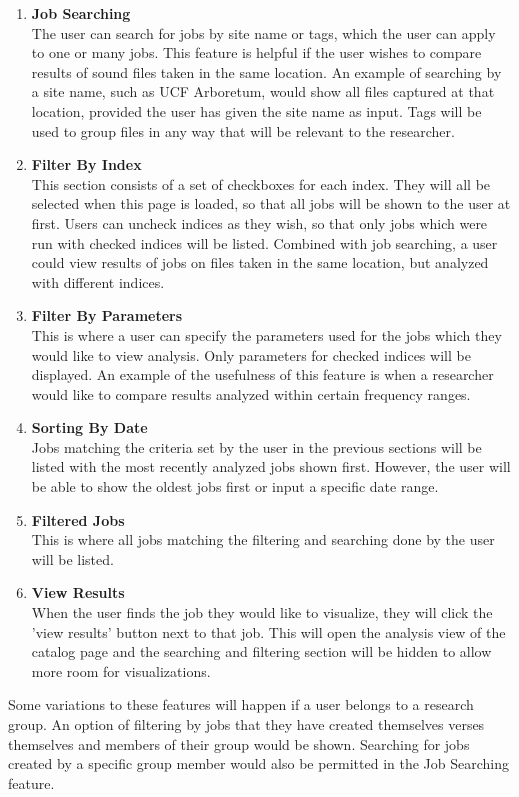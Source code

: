 \begin{enumerate}
    \item \textbf{Job Searching}\\ The user can search for jobs by site name or tags, which the user can apply to one or many jobs. This feature is helpful if the user wishes to compare results of sound files taken in the same location. An example of searching by a site name, such as \textquotesingle UCF Arboretum\textquotesingle , would show all files captured at that location, provided the user has given the site name as input. Tags will be used to group files in any way that will be relevant to the researcher.
    \item \textbf{Filter By Index}\\ This section consists of a set of checkboxes for each index. They will all be selected when this page is loaded, so that all jobs will be shown to the user at first. Users can uncheck indices as they wish, so that only jobs which were run with checked indices will be listed. Combined with job searching, a user could view results of jobs on files taken in the same location, but analyzed with different indices.
    \item \textbf{Filter By Parameters}\\ This is where a user can specify the parameters used for the jobs which they would like to view analysis. Only parameters for checked indices will be displayed. An example of the usefulness of this feature is when a researcher would like to compare results analyzed within certain frequency ranges.
    \item \textbf{Sorting By Date}\\ Jobs matching the criteria set by the user in the previous sections will be listed with the most recently analyzed jobs shown first. However, the user will be able to show the oldest jobs first or input a specific date range.
    \item \textbf{Filtered Jobs}\\ This is where all jobs matching the filtering and searching done by the user will be listed.
    \item \textbf{View Results}\\ When the user finds the job they would like to visualize, they will click the 'view results' button next to that job. This will open the analysis view of the catalog page and the searching and filtering section will be hidden to allow more room for visualizations.
\end{enumerate}
Some variations to these features will happen if a user belongs to a research group. An option of filtering by jobs that they have created themselves verses themselves and members of their group would be shown. Searching for jobs created by a specific group member would also be permitted in the Job Searching feature.\par
